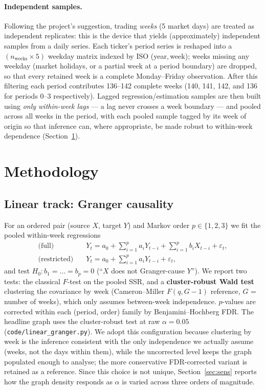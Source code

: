 \documentclass[11pt,a4paper]{article}
\begin{document}
\paragraph{Independent samples.}
Following the project's suggestion, trading \emph{weeks} (5 market days) are
treated as independent replicates: this is the device that yields (approximately)
independent samples from a daily series. Each ticker's period series is reshaped
into a $(n_{\text{weeks}}\times 5)$ weekday matrix indexed by ISO
(year,\,week); weeks missing any weekday (market holidays, or a partial week at a
period boundary) are dropped, so that every retained week is a complete
Monday--Friday observation. After this filtering each period contributes
136--142 complete weeks (140, 141, 142, and 136 for periods 0--3
respectively). Lagged regression/estimation samples are then built using
\emph{only within-week lags} --- a lag never crosses a week boundary --- and
pooled across all weeks in the period, with each pooled sample tagged by its week
of origin so that inference can, where appropriate, be made robust to
within-week dependence (Section~\ref{sec:method}).

\section{Methodology}\label{sec:method}

\subsection{Linear track: Granger causality}
For an ordered pair (source $X$, target $Y$) and Markov order $p\in\{1,2,3\}$ we
fit the pooled within-week regressions
\begin{align}
\text{(full)}\quad      & Y_t = a_0 + \textstyle\sum_{i=1}^{p} a_i Y_{t-i} + \sum_{i=1}^{p} b_i X_{t-i} + \varepsilon_t,\\
\text{(restricted)}\quad& Y_t = a_0 + \textstyle\sum_{i=1}^{p} a_i Y_{t-i} + \varepsilon_t,
\end{align}
and test $H_0: b_1=\dots=b_p=0$ (``$X$ does not Granger-cause $Y$''). We report
two tests: the classical $F$-test on the pooled SSR, and a \textbf{cluster-robust
Wald test} clustering the covariance by week (Cameron--Miller $F(q,G{-}1)$
reference, $G$ = number of weeks), which only assumes between-week independence.
$p$-values are corrected within each (period, order) family by Benjamini--Hochberg
FDR. The headline graph uses the cluster-robust test at raw $\alpha=0.05$
(\texttt{code/linear\_granger.py}). We adopt this configuration because clustering
by week is the inference consistent with the only independence we actually assume
(weeks, not the days within them), while the uncorrected level keeps the graph
populated enough to analyse; the more conservative FDR-corrected variant is
retained as a reference. Since this choice is not unique, Section~\ref{sec:sens}
reports how the graph density responds as $\alpha$ is varied across three orders
of magnitude.
\end{document}
